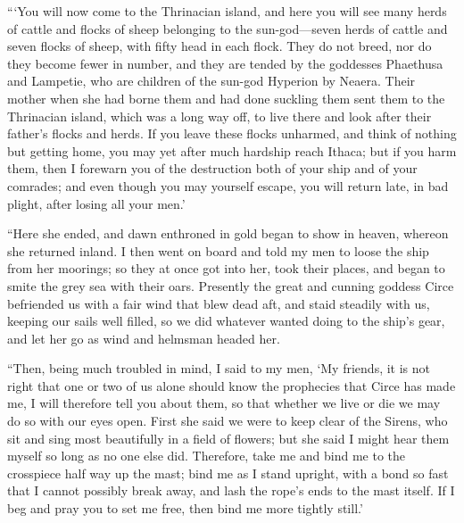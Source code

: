 “‘You will now come to the Thrinacian island, and here you will see many herds
of cattle and flocks of sheep belonging to the sun-god—seven herds of cattle
and seven flocks of sheep, with fifty head in each flock. They do not breed,
nor do they become fewer in number, and they are tended by the goddesses
Phaethusa and Lampetie, who are children of the sun-god Hyperion by Neaera.
Their mother when she had borne them and had done suckling them sent them to
the Thrinacian island, which was a long way off, to live there and look after
their father’s flocks and herds. If you leave these flocks unharmed, and think
of nothing but getting home, you may yet after much hardship reach Ithaca; but
if you harm them, then I forewarn you of the destruction both of your ship and
of your comrades; and even though you may yourself escape, you will return
late, in bad plight, after losing all your men.’

“Here she ended, and dawn enthroned in gold began to show in heaven, whereon
she returned inland. I then went on board and told my men to loose the ship
from her moorings; so they at once got into her, took their places, and began
to smite the grey sea with their oars. Presently the great and cunning goddess
Circe befriended us with a fair wind that blew dead aft, and staid steadily
with us, keeping our sails well filled, so we did whatever wanted doing to the
ship’s gear, and let her go as wind and helmsman headed her.

“Then, being much troubled in mind, I said to my men, ‘My friends, it is not
right that one or two of us alone should know the prophecies that Circe has
made me, I will therefore tell you about them, so that whether we live or die
we may do so with our eyes open. First she said we were to keep clear of the
Sirens, who sit and sing most beautifully in a field of flowers; but she said I
might hear them myself so long as no one else did. Therefore, take me and bind
me to the crosspiece half way up the mast; bind me as I stand upright, with a
bond so fast that I cannot possibly break away, and lash the rope’s ends to the
mast itself. If I beg and pray you to set me free, then bind me more tightly
still.’

